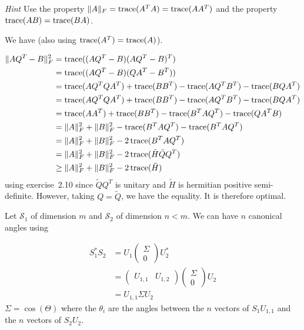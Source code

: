 \begin{solution}
  \emph{Hint} Use the property $\|A\|_F = \operatorname{trace}(A^TA) = \operatorname{trace}(AA^T)$ and the property $\operatorname{trace}(AB) = \operatorname{trace}(BA)$.

  We have (also using $\operatorname{trace}(A^T) = \operatorname{trace}(A)$).

  \begin{align*}
    \|AQ^T - B\|_F^2
    & = \operatorname{trace}((AQ^T - B)(AQ^T - B)^T)\\
    & = \operatorname{trace}((AQ^T - B)(QA^T - B^T))\\
    & = \operatorname{trace}(AQ^TQA^T) + \operatorname{trace}(BB^T) - \operatorname{trace}(AQ^TB^T) - \operatorname{trace}(BQA^T)\\
    & = \operatorname{trace}(AQ^TQA^T) + \operatorname{trace}(BB^T) - \operatorname{trace}(AQ^TB^T) - \operatorname{trace}(BQA^T)\\
    & = \operatorname{trace}(AA^T) + \operatorname{trace}(BB^T) - \operatorname{trace}(B^TAQ^T) - \operatorname{trace}(QA^TB)\\
    & = \|A\|_F^2 + \|B\|_F^2 - \operatorname{trace}(B^TAQ^T) - \operatorname{trace}(B^TAQ^T)\\
    & = \|A\|_F^2 + \|B\|_F^2 - 2\operatorname{trace}(B^TAQ^T)\\
    & = \|A\|_F^2 + \|B\|_F^2 - 2\operatorname{trace}(\tilde{H}\tilde{Q} Q^T)\\
    & \geq \|A\|_F^2 + \|B\|_F^2 - 2\operatorname{trace}(\tilde{H})
  \end{align*}
  using exercise~2.10 since $\tilde{Q}Q^T$ is unitary and $\tilde{H}$ is hermitian positive semi-definite.
  However, taking $Q = \tilde{Q}$, we have the equality. It is therefore optimal.
\end{solution}

\begin{solution}
  Let $\mathcal{S}_1$ of dimension $m$ and $\mathcal{S}_2$ of dimension $n < m$.
  We can have $n$ canonical angles using

  \begin{align*}
    S_1^*S_2
    & = U_1
    \begin{pmatrix}
      \Sigma\\0
    \end{pmatrix}
    U_2^*\\
    & =
    \begin{pmatrix}
      U_{1,1} & U_{1,2}
    \end{pmatrix}
    \begin{pmatrix}
      \Sigma\\0
    \end{pmatrix}
    U_2\\
    & = U_{1,1} \Sigma U_2
  \end{align*}
  $\Sigma = \cos(\Theta)$ where the $\theta_i$ are the angles between the $n$ vectors of $S_1U_{1,1}$
  and the $n$ vectors of $S_2U_2$.
\end{solution}

